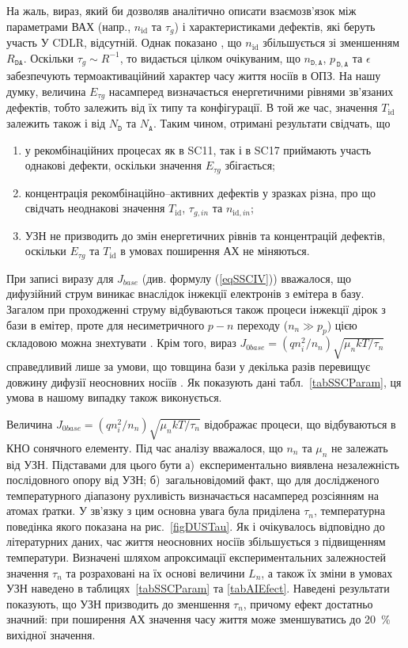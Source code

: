 На жаль, вираз, який би дозволяв аналітично описати взаємозв'язок між параметрами ВАХ (напр., $n_{\mathrm{id}}$ та $\tau_g$)
і характеристиками дефектів, які беруть участь У CDLR, відсутній.
Однак показано \cite{CDLR:JAP1995,CDLR:SSP}, що $n_{\mathrm{id}}$ збільшується зі зменшенням $R_{\mathtt{DA}}$.
Оскільки $\tau_g\sim R^{-1}$,
то видається цілком очікуваним, що $n_{\mathtt{D,A}}$, $p_{\,\mathtt{D,A}}$ та $\epsilon$ забезпечують термоактиваційний характер часу життя носіїв в ОПЗ.
На нашу думку, величина $E_{\tau g}$ насамперед визначається енергетичними рівнями зв'язаних дефектів, тобто
залежить від їх типу та конфігурації.
В той же час, значення $T_\mathrm{id}$ залежить також і від $N_\mathtt{D}$ та $N_\mathtt{A}$.
Таким чином, отримані результати свідчать, що
\begin{enumerate}[label=\asbuk*),leftmargin=0em,itemindent=1.5em]
\item у рекомбінаційних процесах як в SC11, так і в SC17 приймають участь однакові дефекти, оскільки значення $E_{\tau g}$ збігається;
\item концентрація рекомбінаційно--активних дефектів у зразках різна, про що свідчать неоднакові значення $T_\mathrm{id}$, $\tau_{g,in}$ та $n_{\mathrm{id},in}$;
\item УЗН не призводить до змін енергетичних рівнів та концентрацій дефектів, оскільки  $E_{\tau g}$ та $T_\mathrm{id}$ в умовах поширення АХ не міняються.
\end{enumerate}

При записі виразу для $J_{base}$ (див. формулу (\ref{eqSSCIV})) вважалося, що дифузійний струм виникає внаслідок інжекції
електронів з емітера в базу.
Загалом при проходженні струму відбуваються також процеси інжекції дірок з бази в емітер, проте для несиметричного $p-n$ переходу
($n_n\gg p_p$) цією складовою можна знехтувати \cite{Breitenstein2013}.
Крім того, вираз $J_{0base}=(qn_i^2/n_n)\sqrt{\mu_nkT/\tau_n}$ справедливий лише за умови, що товщина бази у декілька разів перевищує
довжину дифузії неосновних носіїв \cite{Sze2012}.
Як показують дані табл.~\ref{tabSSCParam}, ця умова в нашому випадку також виконується.

Величина $J_{0base}=(qn_i^2/n_n)\sqrt{\mu_nkT/\tau_n}$ відображає процеси, що відбуваються в КНО сонячного елементу.
Під час аналізу  вважалося, що $n_n$ та $\mu_n$ не залежать від УЗН.
Підставами для цього бути
а)~експериментально виявлена незалежність послідовного опору від УЗН;
б)~загальновідомий факт, що для дослідженого температурного діапазону рухливість визначається насамперед розсіянням на атомах ґратки.
У зв'язку з цим основна увага була приділена $\tau_n$, температурна поведінка якого показана на рис.~\ref{figDUSTau}.
Як і очікувалось відповідно до літературних даних, час життя неосновних носіїв збільшується з підвищенням температури.
Визначені шляхом апроксимації експериментальних залежностей значення $\tau_n$ та розраховані на їх основі величини $L_n$,
а також їх зміни в умовах УЗН наведено в таблицях~\ref{tabSSCParam} та \ref{tabAIEfect}.
Наведені результати показують, що УЗН призводить до зменшення $\tau_n$, причому ефект достатньо значний:
при поширення АХ значення часу життя може зменшуватись до 20~\% вихідної значення.

